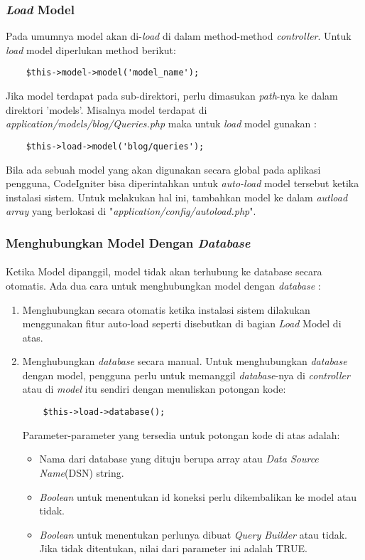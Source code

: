 \subsubsection{\textit{Load} Model}
Pada umumnya model akan di-\textit{load} di dalam method-method \textit{controller}. Untuk \textit{load} model diperlukan method berikut:
\begin{lstlisting}
	$this->model->model('model_name');
\end{lstlisting}
Jika model terdapat pada sub-direktori, perlu dimasukan \textit{path}-nya ke dalam direktori 'models'. Misalnya model terdapat di \textit{application/models/blog/Queries.php} maka untuk \textit{load} model gunakan :
\begin{lstlisting}
	$this->load->model('blog/queries');
\end{lstlisting}
Bila ada sebuah model yang akan digunakan secara global pada aplikasi pengguna, CodeIgniter bisa diperintahkan untuk \textit{auto-load} model tersebut ketika instalasi sistem. Untuk melakukan hal ini, tambahkan model ke dalam \textit{autload array} yang berlokasi di "\textit{application/config/autoload.php}".

\subsubsection{Menghubungkan Model Dengan \textit{Database}}
\paragraph{}Ketika Model dipanggil, model tidak akan terhubung ke database secara otomatis. Ada dua cara untuk menghubungkan model dengan \textit{database} :
\begin{enumerate}
	\item Menghubungkan secara otomatis ketika instalasi sistem dilakukan menggunakan fitur auto-load seperti disebutkan di bagian \textit{Load} Model di atas.
	\item Menghubungkan \textit{database} secara manual. Untuk menghubungkan \textit{database} dengan model, pengguna perlu untuk memanggil \textit{database}-nya di \textit{controller} atau di \textit{model} itu sendiri dengan menuliskan potongan kode:
	\begin{lstlisting}
	$this->load->database();	
	\end{lstlisting}
Parameter-parameter yang tersedia untuk potongan kode di atas adalah:
	\begin{itemize}
	\item Nama dari database yang dituju berupa array atau \textit{Data Source Name}(DSN) string.
	\item \textit{Boolean} untuk menentukan id koneksi perlu dikembalikan ke model atau tidak.
	\item \textit{Boolean} untuk menentukan perlunya dibuat \textit{Query Builder} atau tidak. Jika tidak ditentukan, nilai dari parameter ini adalah TRUE.
	\end{itemize}
\end{enumerate}


